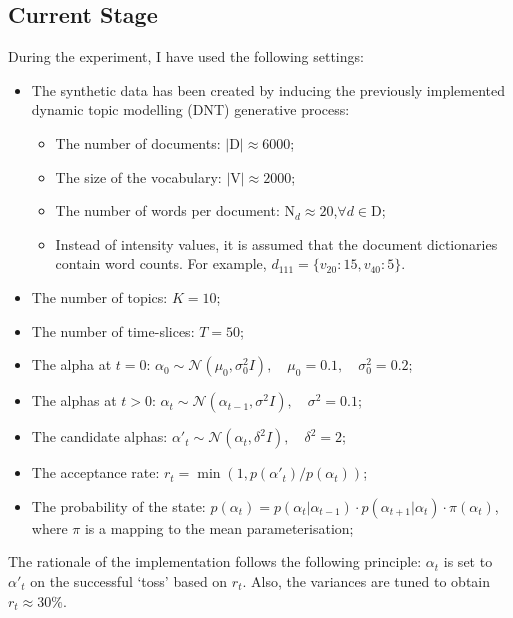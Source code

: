 \documentclass[12pt]{article}
\begin{document}
\subsection*{Current Stage}


\par During the experiment, I have used the following settings:
\begin{itemize}
\item The synthetic data has been created by inducing the previously implemented dynamic topic modelling (DNT) generative process:
\begin{itemize}
\item The number of documents: $|\mbox{D}|\approx6000$;
\item The size of the vocabulary: $|\mbox{V}|\approx2000$;
\item The number of words per document: $\mbox{N}_d\approx20$,\quad$\forall d \in \mbox{D}$;
\item Instead of intensity values, it is assumed that the document dictionaries contain word counts. For example, $d_{111}=\{v_{20}:15, v_{40}:5\}$. 
\end{itemize}
\item The number of topics: $K=10$;
\item The number of time-slices: $T=50$;
\item The alpha at $t=0$: $\alpha_0 \sim \mathcal{N}(\mu_0, \sigma^2_0I),\quad \mu_0 = 0.1,\quad\sigma_0^2 = 0.2$;
\item The alphas at $t>0$: $\alpha_t \sim \mathcal{N}(\alpha_{t-1}, \sigma^2I), \quad\sigma^2 = 0.1$;
\item The candidate alphas: $\alpha'_t \sim \mathcal{N}(\alpha_{t}, \delta^2I), \quad\delta^2 = 2$; 
\item The acceptance rate: $r_t=\min(1,p(\alpha'_t)/p(\alpha_t))$;
\item The probability of the state: $p(\alpha_t)=p(\alpha_{t} | \alpha_{t-1})\cdot p(\alpha_{t+1} | \alpha_{t})\cdot \pi(\alpha_t)$, where $\pi$ is a mapping to the mean parameterisation;
\end{itemize}

The rationale of the implementation follows the following principle: $\alpha_t$ is set to $\alpha'_t$ on the successful `toss' based on $r_t$. Also, the variances are tuned to obtain $r_t\approx30\%$.
\end{document}
